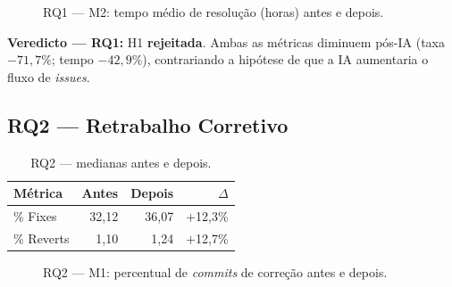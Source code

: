 \documentclass[12pt,a4paper,twocolumn]{article}
\begin{document}
\begin{figure}[t]
\centering
{}
\caption{RQ1 — M2: tempo médio de resolução (horas) antes e depois.}
\label{fig:rq1m2}
\end{figure}

\textbf{Veredicto — RQ1:} H1 \textbf{rejeitada}. Ambas as métricas diminuem
pós-IA (taxa $-71{,}7\%$; tempo $-42{,}9\%$), contrariando a hipótese de que
a IA aumentaria o fluxo de \textit{issues}.

\subsection{RQ2 — Retrabalho Corretivo}

\begin{table}[t]
\centering\caption{RQ2 — medianas antes e depois.}\label{tab:rq2}
\small\setlength{\tabcolsep}{4pt}
\begin{tabular}{lrrr}
\toprule
\textbf{Métrica} & \textbf{Antes} & \textbf{Depois} & \textbf{$\Delta$} \\
\midrule
\% Fixes  & 32,12 & 36,07 & \textcolor{agreen}{$+$12,3\%} \\
\% Reverts & 1,10 &  1,24 & \textcolor{agreen}{$+$12,7\%} \\
\bottomrule
\end{tabular}
\end{table}

\begin{figure}[t]
\centering
{}
\caption{RQ2 — M1: percentual de \textit{commits} de correção antes e depois.}
\label{fig:rq2m1}
\end{figure}
\end{document}
